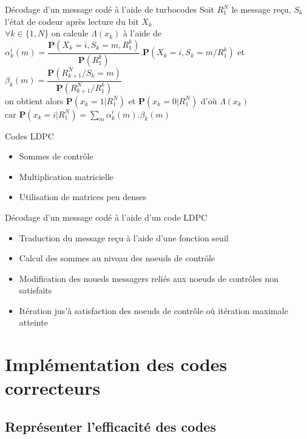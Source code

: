 \documentclass[11pt]{beamer}
\begin{document}
\begin{frame}{D\'ecodage d'un message cod\'e \`a l'aide de turbocodes}
Soit $R_1^N$ le message re\c{c}u, $S_k$ l'\'etat de codeur apr\`es lecture du bit $X_k$\\
$\forall k \in \{1, N\}$ on calcule $\Lambda(x_k)$ \`a l'aide de $\alpha_k^i(m) = \dfrac{\mathbf{P}(X_k = i, S_k = m, R_1^k)}{\mathbf{P}(R_1^k)}.\mathbf{P}(X_k = i, S_k = m / R_1^k)$ et\\
$\beta_k(m) = \dfrac{\mathbf{P}(R_{k+1}^N / S_k = m)}{\mathbf{P}(R_{k+1}^N / R_1^k)}$\\
on obtient alors $\mathbf{P}(x_k = 1 | R_1^N)$ et $\mathbf{P}(x_k = 0 | R_1^N)$ d'o\`u $\Lambda(x_k)$\\
car $\mathbf{P}(x_k = i | R_1^N) = \sum\limits_m\alpha_k^i(m).\beta_k(m)$
\end{frame}

\begin{frame}{Codes LDPC}
	\begin{itemize}
		\item Sommes de contrôle
		\item Multiplication matricielle
		\item Utilisation de matrices peu denses
	\end{itemize}
\end{frame}

\begin{frame}{D\'ecodage d'un message cod\'e \`a l'aide d'un code LDPC}
	\begin{itemize}
		\item Traduction du message re\c{c}u \`a l'aide d'une fonction seuil
		\item Calcul des sommes au niveau des noeuds de contr\^ole
		\item Modification des noueds messagers reli\'es aux noeuds de contrôles non satisfaits
		\item It\'eration jus'\`a satisfaction des noeuds de contr\^ole o\`u it\'eration maximale atteinte
	\end{itemize}
\end{frame}


\section{Impl\'ementation des codes correcteurs}
\subsection{Repr\'esenter l'efficacit\'e des codes}
\end{document}

